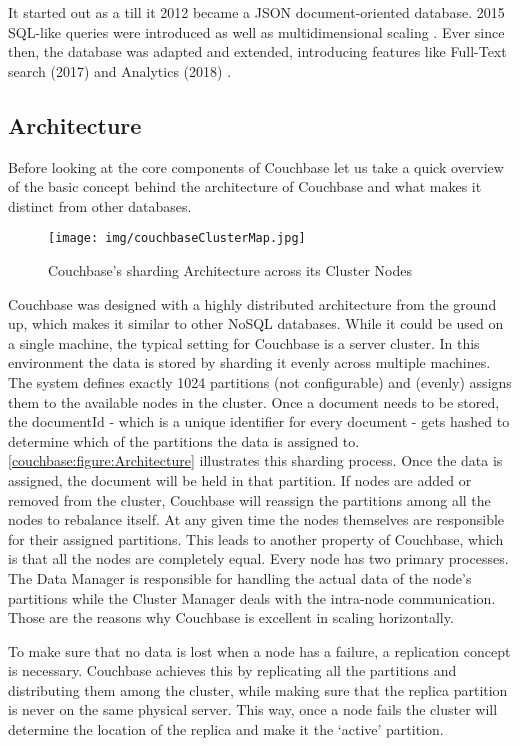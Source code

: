 It started out as a   till it 2012 became a JSON document-oriented database. 2015 SQL-like queries were introduced as well as multidimensional scaling \parencite{couchbaseAbout}. Ever since then, the database was adapted and extended, introducing features like Full-Text search (2017) and Analytics (2018) \parencite{couchbaseAbout}.

\subsection{Architecture}
Before looking at the core components of Couchbase let us take a quick overview of the basic concept behind the architecture of Couchbase and what makes it distinct from other databases.

\begin{figure}[H]
    \texttt{[image: img/couchbaseClusterMap.jpg]}
    \caption{Couchbase's sharding Architecture across its Cluster Nodes}
    \label{couchbase:figure:Architecture}
\end{figure}

Couchbase was designed with a highly distributed architecture from the ground up, which makes it similar to other NoSQL databases. While it could be used on a single machine, the typical setting for Couchbase is a server cluster.
In this environment the data is stored by sharding it evenly across multiple machines. The system defines exactly 1024 partitions (not configurable) and (evenly) assigns them to the available nodes in the cluster. Once a document needs to be stored, the documentId - which is a unique identifier for every document - gets hashed to determine which of the partitions the data is assigned to. \autoref{couchbase:figure:Architecture} illustrates this sharding process. Once the data is assigned, the document will be held in that partition. If nodes are added or removed from the cluster, Couchbase will reassign the partitions among all the nodes to rebalance itself. At any given time the nodes themselves are responsible for their assigned partitions. This leads to another property of Couchbase, which is that all the nodes are completely equal. Every node has two primary processes. The Data Manager is responsible for handling the actual data of the node's partitions while the Cluster Manager deals with the intra-node communication. Those are the reasons why Couchbase is excellent in scaling horizontally. \parencite{objelean}

To make sure that no data is lost when a node has a failure, a replication concept is necessary. Couchbase achieves this by replicating all the partitions and distributing them among the cluster, while making sure that the replica partition is never on the same physical server. This way, once a node fails the cluster will determine the location of the replica and make it the ‘active’ partition.

